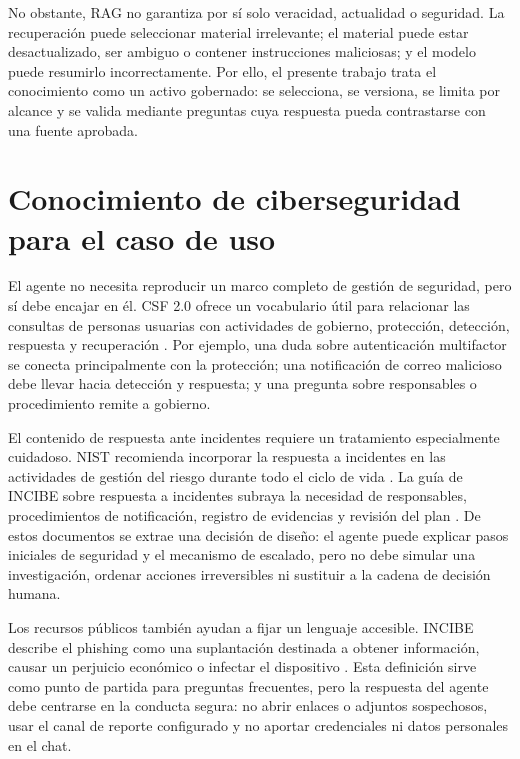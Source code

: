 \documentclass[12pt,twoside,titlepage]{book}
\begin{document}
No obstante, RAG no garantiza por sí solo veracidad, actualidad o seguridad. La
recuperación puede seleccionar material irrelevante; el material puede estar
desactualizado, ser ambiguo o contener instrucciones maliciosas; y el modelo
puede resumirlo incorrectamente. Por ello, el presente trabajo trata el
conocimiento como un activo gobernado: se selecciona, se versiona, se limita por
alcance y se valida mediante preguntas cuya respuesta pueda contrastarse con una
fuente aprobada.

\section{Conocimiento de ciberseguridad para el caso de uso}
\label{sec:conocimiento-ciberseguridad}

El agente no necesita reproducir un marco completo de gestión de seguridad, pero
sí debe encajar en él. CSF 2.0 ofrece un vocabulario útil para relacionar las
consultas de personas usuarias con actividades de gobierno, protección,
detección, respuesta y recuperación \cite{nistCsf2024}. Por ejemplo, una duda
sobre autenticación multifactor se conecta principalmente con la protección; una
notificación de correo malicioso debe llevar hacia detección y respuesta; y una
pregunta sobre responsables o procedimiento remite a gobierno.

El contenido de respuesta ante incidentes requiere un tratamiento especialmente
cuidadoso. NIST recomienda incorporar la respuesta a incidentes en las
actividades de gestión del riesgo durante todo el ciclo de vida
\cite{nistIncident2025}. La guía de INCIBE sobre respuesta a incidentes subraya
la necesidad de responsables, procedimientos de notificación, registro de
evidencias y revisión del plan \cite{incibeCrisis}. De estos documentos se
extrae una decisión de diseño: el agente puede explicar pasos iniciales de
seguridad y el mecanismo de escalado, pero no debe simular una investigación,
ordenar acciones irreversibles ni sustituir a la cadena de decisión humana.

Los recursos públicos también ayudan a fijar un lenguaje accesible. INCIBE
describe el phishing como una suplantación destinada a obtener información,
causar un perjuicio económico o infectar el dispositivo \cite{incibePhishing}.
Esta definición sirve como punto de partida para preguntas frecuentes, pero la
respuesta del agente debe centrarse en la conducta segura: no abrir enlaces o
adjuntos sospechosos, usar el canal de reporte configurado y no aportar
credenciales ni datos personales en el chat.
\end{document}
